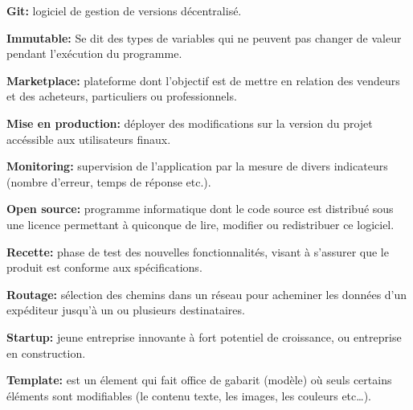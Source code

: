 \textbf{Git:} logiciel de gestion de versions décentralisé.

\bigskip

\textbf{Immutable:} Se dit des types de variables qui ne peuvent pas
changer de valeur pendant l'exécution du programme.

\bigskip

\textbf{Marketplace:} plateforme dont l'objectif est de mettre en
relation des vendeurs et des acheteurs, particuliers ou professionnels.

\bigskip

\textbf{Mise en production:} déployer des modifications sur la version
du projet accéssible aux utilisateurs finaux.

\bigskip

\textbf{Monitoring:} supervision de l'application par la mesure de
divers indicateurs (nombre d'erreur, temps de réponse etc.).

\bigskip

\textbf{Open source:} programme informatique dont le code source est
distribué sous une licence permettant à quiconque de lire, modifier ou
redistribuer ce logiciel.

\bigskip

\textbf{Recette:} phase de test des nouvelles fonctionnalités, visant à
s'assurer que le produit est conforme aux spécifications.

\bigskip

\textbf{Routage:} sélection des chemins dans un réseau pour acheminer
les données d'un expéditeur jusqu'à un ou plusieurs destinataires.

\bigskip

\textbf{Startup:} jeune entreprise innovante à fort potentiel de
croissance, ou entreprise en construction.

\bigskip

\textbf{Template:} est un élement qui fait office de gabarit (modèle) où
seuls certains éléments sont modifiables (le contenu texte, les images,
les couleurs etc\ldots{}).
